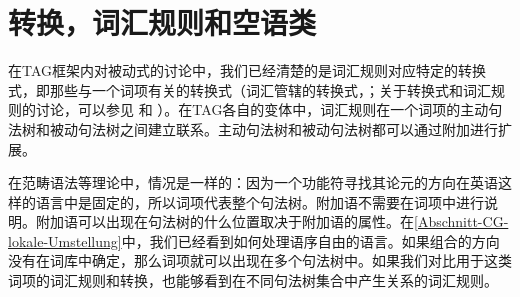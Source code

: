 \section{转换，词汇规则和空语类}
\label{Abschnitt-leere-Elemente-LRs-Transformations}

在TAG框架内对被动式的讨论中，我们已经清楚的是词汇规则对应特定的转换式，即那些与一个词项有关的转换式（词汇管辖的转换式，\citealp{Dowty78a}；关于转换式和词汇规则的讨论，可以参见 和 ）。在TAG\indextagc 各自的变体中，词汇规则在一个词项的主动句法树和被动句法树之间建立联系。主动句法树和被动句法树都可以通过附加进行扩展。

在范畴语法\indexcgc 等理论中，情况是一样的：因为一个功能符寻找其论元的方向在英语这样的语言中是固定的，所以词项代表整个句法树。附加语不需要在词项中进行说明。附加语可以出现在句法树的什么位置取决于附加语的属性。在\ref{Abschnitt-CG-lokale-Umstellung}中，我们已经看到如何处理语序自由的语言。如果组合的方向没有在词库中确定，那么词项就可以出现在多个句法树中。如果我们对比用于这类词项的词汇规则和转换，也能够看到在不同句法树集合中产生关系的词汇规则。

